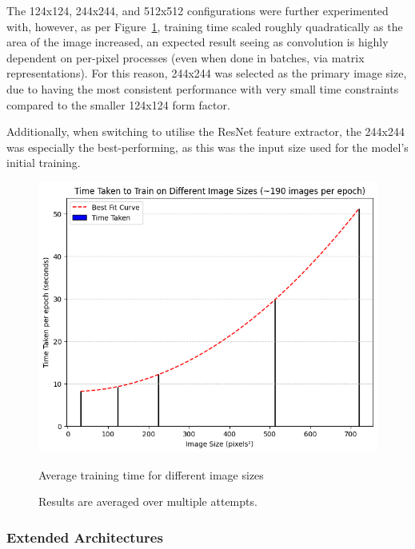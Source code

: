                         The 124x124, 244x244, and 512x512 configurations were further experimented with, however, as per Figure~\ref{fig:CNNSize_Time}, training time scaled roughly quadratically as the area of the image increased, an expected result seeing as convolution is highly dependent on per-pixel processes (even when done in batches, via matrix representations). For this reason, 244x244 was selected as the primary image size, due to having the most consistent performance with very small time constraints compared to the smaller 124x124 form factor.
    
                        Additionally, when switching to utilise the ResNet feature extractor, the 244x244 was especially the best-performing, as this was the input size used for the model's initial training.
                
                        \begin{figure}[h]
                            \centering
                            \includegraphics[width=\textwidth]{images/CNNSize_Time.png}
                            \caption{Average training time for different image sizes}
                            \label{fig:CNNSize_Time}
                            \caption*{Results are averaged over multiple attempts.}
                        \end{figure}
    
            \subsubsection{Extended Architectures}
    

